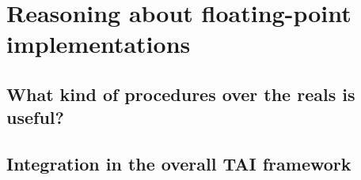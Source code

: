 \section{Reasoning about floating-point implementations}

\subsection{What kind of procedures over the reals is useful?}

\subsection{Integration in the overall TAI framework}

